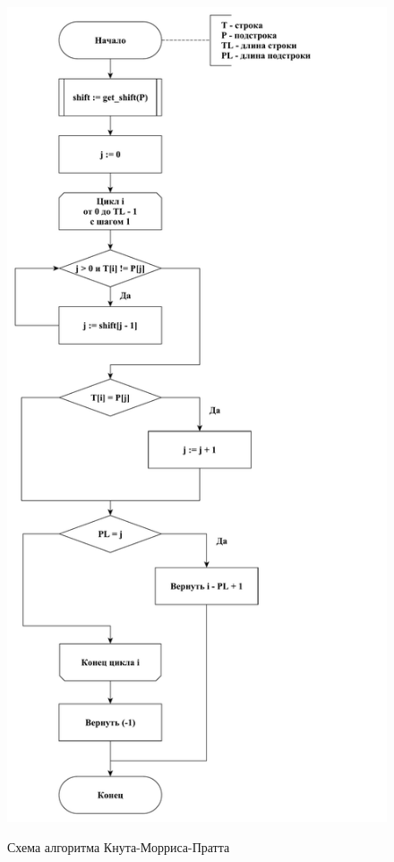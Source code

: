 \documentclass[a4paper,12pt]{article}
\begin{document}
\begin{figure}[h!]
\begin{center}
{\includegraphics[scale = 0.4]{diagram/kmp.pdf}}
\caption{
Схема алгоритма Кнута-Морриса-Пратта}
\label{fig:kmp}
\end{center}
\end{figure}
\end{document}
